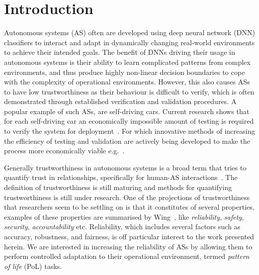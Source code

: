 \section{Introduction}

Autonomous systems (AS) often are developed using deep neural network (DNN) classifiers to interact and adapt in dynamically changing real-world environments to achieve their intended goals. 
%
The benefit of DNNs driving their usage in autonomous systems is their ability to learn complicated patterns 
from complex environments, and thus produce highly non-linear decision boundaries to cope with the complexity of operational environments.
%
However, this also causes ASs to have low trustworthiness as their behaviour is difficult to verify, 
%
which is often demonstrated through established verification and validation procedures.  
%
A popular example of such ASs, are self-driving cars. Current research shows that for each self-driving car an economically impossible amount of testing is required to verify the system for deployment~\cite{RR-1478-RC}. For which innovative methods of increasing the efficiency of testing and validation are actively being developed to make the process more economically viable e.g.~\cite{chance2020agency,eder2021complete}. 

Generally trustworthiness in autonomous systems is a broad term that tries to quantify trust in relationships, specifically for human-AS interactions~\cite{KateDevitt2018}.
%
The definition of trustworthiness is still maturing and methods for quantifying trustworthiness is still under research.
%
One of the projections of trustworthiness that researchers seem to be settling on is that it constitutes of several properties, examples of these properties are summarised by Wing~\cite{Wing2021}, like \textit{reliability}, \textit{safety}, \textit{security}, \textit{accountability} etc.
%
Reliability, which includes several factors such as accuracy, robustness, and fairness, is off particular interest to the work presented herein. 
%
We are interested in increasing the reliability of ASs by allowing them to perform controlled adaptation to their operational environment, termed \textit{pattern of life} (PoL) tasks.


